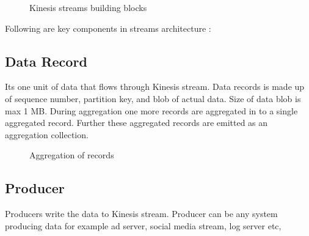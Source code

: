 \documentclass[9pt,twocolumn,twoside]{styles/osajnl}
\begin{document}
\begin{figure}[htbp]
\centering
{}
\caption{Kinesis streams building blocks} \cite{www-kinesis-arch}
\label{fig:false-color}
\end{figure}

Following are key components in streams architecture \cite{www-kinesis-arch} :
\subsection{Data Record}
Its one unit of data that flows through Kinesis stream. Data records is made up of sequence number, partition key, and blob of actual data. Size of data blob is max 1 MB. During aggregation one more records are aggregated in to a single aggregated record. Further these aggregated records are emitted as an aggregation collection.

\begin{figure}[htbp]
\centering
{}
\caption{Aggregation of records}
\label{fig:false-color}
\end{figure}

\subsection{Producer}
Producers write the data to Kinesis stream. Producer can be any system producing data for example ad server, social media stream, log server etc,
\end{document}
